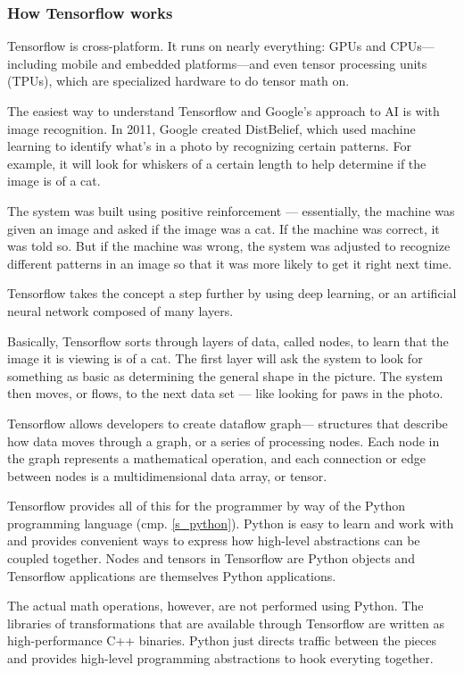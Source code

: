 \subsubsection{How Tensorflow works}

Tensorflow is cross-platform. It runs on nearly everything:
GPUs and CPUs—including mobile and embedded platforms—and
even tensor processing units (TPUs), which are specialized
hardware to do tensor math on.\cite{david1}

The easiest way to understand Tensorflow and Google's
approach to AI is with image recognition. In 2011, Google
created DistBelief, which used machine learning to identify
what's in a photo by recognizing certain patterns. For
example, it will look for whiskers of a certain length to
help determine if the image is of a cat.

The system was built using positive reinforcement —
essentially, the machine was given an image and asked if
the image was a cat. If the machine was correct, it was
told so. But if the machine was wrong, the system was
adjusted to recognize different patterns in an image so
that it was more likely to get it right next time.

Tensorflow takes the concept a step further by using deep
learning, or an artificial neural network composed of many
layers.

Basically, Tensorflow sorts through layers of data, called
nodes, to learn that the image it is viewing is of a cat.
The first layer will ask the system to look for something
as basic as determining the general shape in the picture.
The system then moves, or flows, to the next data set —
like looking for paws in the photo.\cite{david6}

Tensorflow allows developers to create dataflow graph—
structures that describe how data moves through a graph, or
a series of processing nodes. Each node in the graph
represents a mathematical operation, and each connection or
edge between nodes is a multidimensional data array, or
tensor.

Tensorflow provides all of this for the programmer by way
of the Python programming language (cmp. \ref{s_python}).
Python is easy to learn and work with and provides
convenient ways to express how high-level abstractions can
be coupled together. Nodes and tensors in Tensorflow are
Python objects and Tensorflow applications are themselves
Python applications.

The actual math operations, however, are not performed
using Python. The libraries of transformations that are
available through Tensorflow are written as
high-performance C++ binaries. Python just directs traffic
between the pieces and provides high-level programming
abstractions to hook everyting together.

